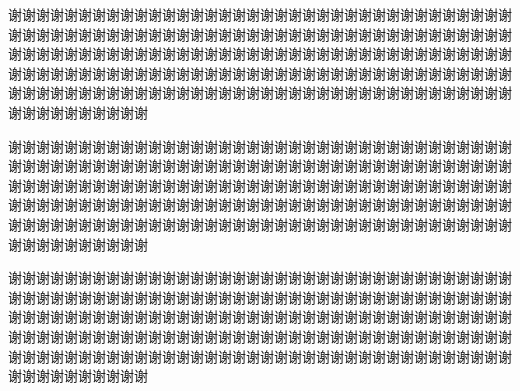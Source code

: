 谢谢谢谢谢谢谢谢谢谢谢谢谢谢谢谢谢谢谢谢谢谢谢谢谢谢谢谢谢谢谢谢谢谢谢谢谢谢谢谢谢谢谢谢谢谢谢谢谢谢谢谢谢谢谢谢谢谢谢谢谢谢谢谢谢谢谢谢谢谢谢谢谢谢谢谢谢谢谢谢谢谢谢谢谢谢谢谢谢谢谢谢谢谢谢谢谢谢谢谢谢谢谢谢谢谢谢谢谢谢谢谢谢谢谢谢谢谢谢谢谢谢谢谢谢谢谢谢谢谢谢谢谢谢谢谢谢谢谢谢谢谢谢谢谢谢谢谢谢谢谢谢谢谢谢谢谢谢谢谢谢谢谢谢谢谢谢谢谢谢谢谢谢谢谢谢谢谢谢谢谢谢谢谢谢谢谢谢谢谢

谢谢谢谢谢谢谢谢谢谢谢谢谢谢谢谢谢谢谢谢谢谢谢谢谢谢谢谢谢谢谢谢谢谢谢谢谢谢谢谢谢谢谢谢谢谢谢谢谢谢谢谢谢谢谢谢谢谢谢谢谢谢谢谢谢谢谢谢谢谢谢谢谢谢谢谢谢谢谢谢谢谢谢谢谢谢谢谢谢谢谢谢谢谢谢谢谢谢谢谢谢谢谢谢谢谢谢谢谢谢谢谢谢谢谢谢谢谢谢谢谢谢谢谢谢谢谢谢谢谢谢谢谢谢谢谢谢谢谢谢谢谢谢谢谢谢谢谢谢谢谢谢谢谢谢谢谢谢谢谢谢谢谢谢谢谢谢谢谢谢谢谢谢谢谢谢谢谢谢谢谢谢谢谢谢谢谢谢谢谢

谢谢谢谢谢谢谢谢谢谢谢谢谢谢谢谢谢谢谢谢谢谢谢谢谢谢谢谢谢谢谢谢谢谢谢谢谢谢谢谢谢谢谢谢谢谢谢谢谢谢谢谢谢谢谢谢谢谢谢谢谢谢谢谢谢谢谢谢谢谢谢谢谢谢谢谢谢谢谢谢谢谢谢谢谢谢谢谢谢谢谢谢谢谢谢谢谢谢谢谢谢谢谢谢谢谢谢谢谢谢谢谢谢谢谢谢谢谢谢谢谢谢谢谢谢谢谢谢谢谢谢谢谢谢谢谢谢谢谢谢谢谢谢谢谢谢谢谢谢谢谢谢谢谢谢谢谢谢谢谢谢谢谢谢谢谢谢谢谢谢谢谢谢谢谢谢谢谢谢谢谢谢谢谢谢谢谢谢谢谢